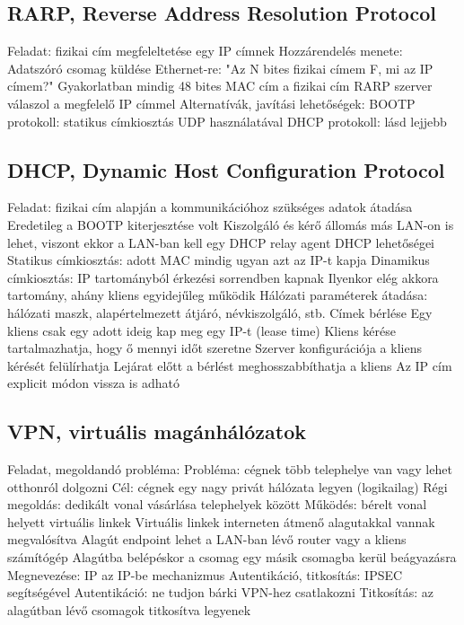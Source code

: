 \documentclass[12pt,a4paper]{article}
\begin{document}
\subsection{RARP, Reverse Address Resolution Protocol}

\begin{outline}
	\1 Feladat: fizikai cím megfeleltetése egy IP címnek
	\1 Hozzárendelés menete:
		\2 Adatszóró csomag küldése Ethernet-re: "Az N bites fizikai címem F, mi az IP címem?"
			\3 Gyakorlatban mindig 48 bites MAC cím a fizikai cím
		\2 RARP szerver válaszol a megfelelő IP címmel
	\1 Alternatívák, javítási lehetőségek:
		\2 BOOTP protokoll: statikus címkiosztás UDP használatával
		\2 DHCP protokoll: lásd lejjebb
\end{outline}

\subsection{DHCP, Dynamic Host Configuration Protocol}

\begin{outline}
	\1 Feladat: fizikai cím alapján a kommunikációhoz szükséges adatok átadása
		\2 Eredetileg a BOOTP kiterjesztése volt
	\1 Kiszolgáló és kérő állomás más LAN-on is lehet, viszont ekkor a LAN-ban kell egy DHCP relay agent
	\1 DHCP lehetőségei
		\2 Statikus címkiosztás: adott MAC mindig ugyan azt az IP-t kapja
		\2 Dinamikus címkiosztás: IP tartományból érkezési sorrendben kapnak
			\3 Ilyenkor elég akkora tartomány, ahány kliens egyidejűleg működik
		\2 Hálózati paraméterek átadása: hálózati maszk, alapértelmezett átjáró, névkiszolgáló, stb.
	\1 Címek bérlése
		\2 Egy kliens csak egy adott ideig kap meg egy IP-t (lease time)
			\3 Kliens kérése tartalmazhatja, hogy ő mennyi időt szeretne
			\3 Szerver konfigurációja a kliens kérését felülírhatja
		\2 Lejárat előtt a bérlést meghosszabbíthatja a kliens
		\2 Az IP cím explicit módon vissza is adható
\end{outline}

\pagebreak

\subsection{VPN, virtuális magánhálózatok}

\begin{outline}
	\1 Feladat, megoldandó probléma:
		\2 Probléma: cégnek több telephelye van vagy lehet otthonról dolgozni
		\2 Cél: cégnek egy nagy privát hálózata legyen (logikailag)
		\2 Régi megoldás: dedikált vonal vásárlása telephelyek között
	\1 Működés: bérelt vonal helyett virtuális linkek
		\2 Virtuális linkek interneten átmenő alagutakkal vannak megvalósítva
		\2 Alagút endpoint lehet a LAN-ban lévő router vagy a kliens számítógép
		\2 Alagútba belépéskor a csomag egy másik csomagba kerül beágyazásra
			\3 Megnevezése: IP az IP-be mechanizmus
	\1 Autentikáció, titkosítás: IPSEC segítségével
		\2 Autentikáció: ne tudjon bárki VPN-hez csatlakozni
		\2 Titkosítás: az alagútban lévő csomagok titkosítva legyenek
\end{outline}
\end{document}
